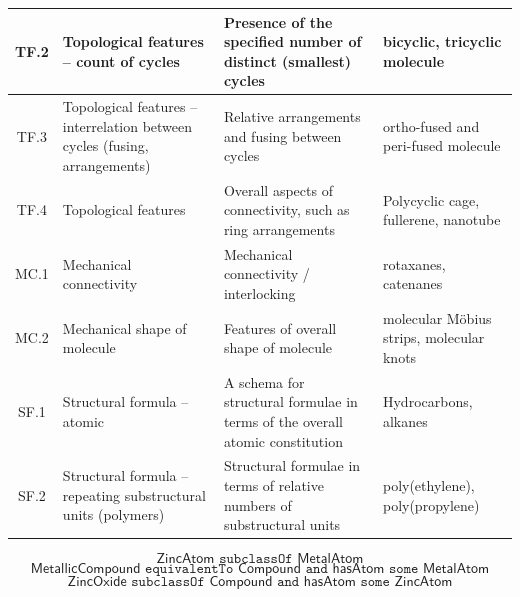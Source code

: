 \documentclass[10pt]{bmc_article}
\newenvironment{bmcformat}{\baselineskip20pt\sloppy\setboolean{publ}{false}}{\baselineskip20pt\sloppy}
\begin{document}
\begin{bmcformat}
{\begin{tabular}{|c|p{3cm}|p{5cm}|p{4cm}|}
        TF.2 & Topological features -- count of cycles  & Presence of the specified number of distinct (smallest) cycles & bicyclic, tricyclic molecule \\ \hline
        TF.3 & Topological features -- interrelation between cycles (fusing, arrangements)  & Relative arrangements and fusing between cycles  & ortho-fused and peri-fused molecule \\ \hline
        TF.4 & Topological features & Overall aspects of connectivity, such as ring arrangements & Polycyclic cage, fullerene, nanotube \\ \hline
        MC.1 & Mechanical connectivity & Mechanical connectivity / interlocking & rotaxanes, catenanes \\ \hline
        MC.2 & Mechanical shape of molecule & Features of overall shape of molecule & molecular M\"{o}bius strips, molecular knots  \\ \hline
        SF.1 & Structural formula -- atomic & A schema for structural formulae in terms of the overall atomic constitution & Hydrocarbons, alkanes \\ \hline
        SF.2 & Structural formula -- repeating substructural units (polymers) & Structural formulae in terms of relative numbers of substructural units & poly(ethylene), poly(propylene) \\ \hline
      \end{tabular}
      } 


\begin{equation} \label{ax:zinc}\mathsf{ZincAtom} \texttt{ subclassOf } \mathsf{MetalAtom}\end{equation} 
\begin{equation}\label{ax:metallic compound}\mathsf{MetallicCompound} \texttt{ equivalentTo } \mathsf{Compound} \texttt{ and } \mathsf{hasAtom} \texttt{ some } \mathsf{MetalAtom}\end{equation}
\begin{equation}\label{ax:zinc oxide} \mathsf{ZincOxide} \texttt{ subclassOf } \mathsf{Compound} \texttt{ and } \mathsf{hasAtom}  \texttt{ some } \mathsf{ZincAtom}\end{equation} 



\end{bmcformat}
\end{document}
